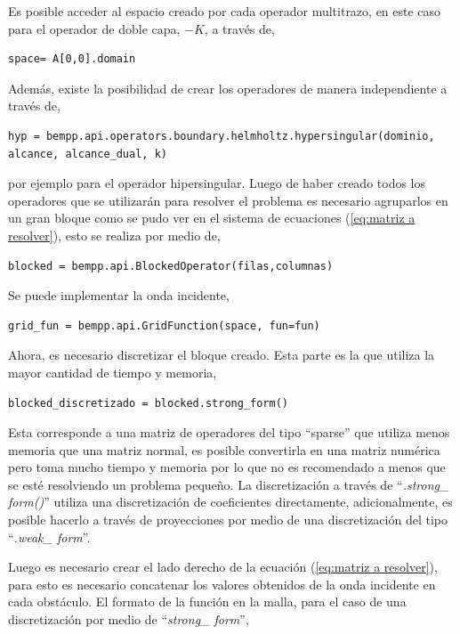 \documentclass[12pt,letterpaper]{article}
\numberwithin{equation}{section}
\begin{document}
Es posible acceder al espacio creado por cada operador multitrazo, en este caso para el operador de doble capa, $-K$, a través de,

\begin{lstlisting}
space= A[0,0].domain
\end{lstlisting}

Además, existe la posibilidad de crear los operadores de manera independiente a través de,

\begin{lstlisting}
hyp = bempp.api.operators.boundary.helmholtz.hypersingular(dominio, alcance, alcance_dual, k)
\end{lstlisting}

por ejemplo para el operador hipersingular. Luego de haber creado todos los operadores que se utilizarán para resolver el problema es necesario agruparlos en un gran bloque como se pudo ver en el sistema de ecuaciones (\ref{eq:matriz a resolver}), esto se realiza por medio de,

\begin{lstlisting}
blocked = bempp.api.BlockedOperator(filas,columnas)
\end{lstlisting}

Se puede implementar la onda incidente,

\begin{lstlisting}
grid_fun = bempp.api.GridFunction(space, fun=fun)
\end{lstlisting}

Ahora, es necesario discretizar el bloque creado. Esta parte es la que utiliza la mayor cantidad de tiempo y memoria,

\begin{lstlisting}
blocked_discretizado = blocked.strong_form()
\end{lstlisting} 

Esta corresponde a una matriz de operadores del tipo ``sparse'' que utiliza menos memoria que una matriz normal, es posible convertirla en una matriz numérica pero toma mucho tiempo y memoria por lo que no es recomendado a menos que se esté resolviendo un problema pequeño. La discretización a través de ``\textit{.strong\_ form()}'' utiliza una discretización de coeficientes directamente, adicionalmente, es posible hacerlo a través de proyecciones por medio de una discretización del tipo ``\textit{.weak\_ form}''. 

\pagebreak
Luego es necesario crear el lado derecho de la ecuación (\ref{eq:matriz a resolver}), para esto es necesario concatenar los valores obtenidos de la onda incidente en cada obstáculo. El formato de la función en la malla, para el caso de una discretización por medio de ``\textit{strong\_ form}'',
\end{document}

